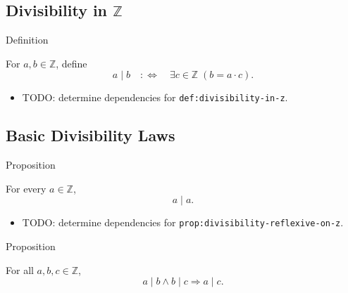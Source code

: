 \subsection*{Divisibility in $\mathbb{Z}$}

\begin{definitionbox}{Definition}
\begin{definition}
\label{def:divisibility-in-z}
For $a,b\in\mathbb{Z}$, define
\[
a\mid b
\quad:\Longleftrightarrow\quad
\exists c\in\mathbb{Z}\;(b=a\cdot c).
\]
\end{definition}
\end{definitionbox}

\begin{dependencies}
\begin{itemize}
  \item TODO: determine dependencies for \texttt{def:divisibility-in-z}.
\end{itemize}
\end{dependencies}

\subsection*{Basic Divisibility Laws}

\begin{propositionbox}{Proposition}
\begin{proposition}
\label{prop:divisibility-reflexive-on-z}
For every $a\in\mathbb{Z}$,
\[
a\mid a.
\]
\end{proposition}
\end{propositionbox}

\begin{dependencies}
\begin{itemize}
  \item TODO: determine dependencies for \texttt{prop:divisibility-reflexive-on-z}.
\end{itemize}
\end{dependencies}

\begin{propositionbox}{Proposition}
\begin{proposition}
\label{prop:divisibility-transitive-on-z}
For all $a,b,c\in\mathbb{Z}$,
\[
a\mid b\land b\mid c \Longrightarrow a\mid c.
\]
\end{proposition}
\end{propositionbox}

